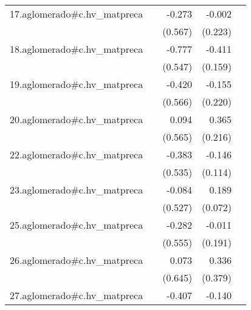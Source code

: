 {\begin{longtable}{l*{4}{D{.}{.}{-1}}}
\addlinespace
17.aglomerado#c.hv\_matpreca&                     &      -0.273         &      -0.002         &                     \\
            &                     &     (0.567)         &     (0.223)         &                     \\
\addlinespace
18.aglomerado#c.hv\_matpreca&                     &      -0.777         &      -0.411\sym{**} &                     \\
            &                     &     (0.547)         &     (0.159)         &                     \\
\addlinespace
19.aglomerado#c.hv\_matpreca&                     &      -0.420         &      -0.155         &                     \\
            &                     &     (0.566)         &     (0.220)         &                     \\
\addlinespace
20.aglomerado#c.hv\_matpreca&                     &       0.094         &       0.365         &                     \\
            &                     &     (0.565)         &     (0.216)         &                     \\
\addlinespace
22.aglomerado#c.hv\_matpreca&                     &      -0.383         &      -0.146         &                     \\
            &                     &     (0.535)         &     (0.114)         &                     \\
\addlinespace
23.aglomerado#c.hv\_matpreca&                     &      -0.084         &       0.189\sym{**} &                     \\
            &                     &     (0.527)         &     (0.072)         &                     \\
\addlinespace
25.aglomerado#c.hv\_matpreca&                     &      -0.282         &      -0.011         &                     \\
            &                     &     (0.555)         &     (0.191)         &                     \\
\addlinespace
26.aglomerado#c.hv\_matpreca&                     &       0.073         &       0.336         &                     \\
            &                     &     (0.645)         &     (0.379)         &                     \\
\addlinespace
27.aglomerado#c.hv\_matpreca&                     &      -0.407         &      -0.140\sym{**} &                     \\

\end{longtable}}
